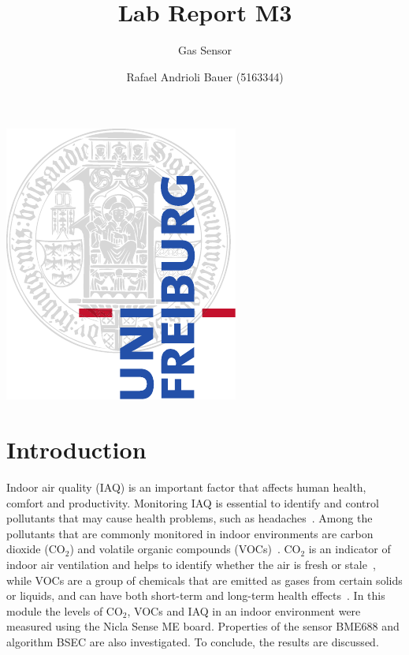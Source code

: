 \documentclass[DIV=14]{scrartcl}
\title{Lab Report M3}
\subtitle{Gas Sensor}
\author{Rafael Andrioli Bauer (5163344)}
\begin{document}
    \maketitle

    \thispagestyle{empty}

    \vfill
    \begin{center}
        \includegraphics{ufcd-logo-e1-a4-color.pdf} \vspace{1cm} \\
    \end{center}
    \vfill

    \clearpage


    \section{Introduction}

    Indoor air quality (IAQ) is an important factor that affects human health, comfort and productivity.
    Monitoring IAQ is essential to identify and control pollutants that may cause health problems, such as headaches~\cite{labManual}.
    Among the pollutants that are commonly monitored in indoor environments are carbon dioxide ($\mathrm{CO_2}$) and volatile
    organic compounds (VOCs)~\cite{labManual}.
    $\mathrm{CO_2}$ is an indicator of indoor air ventilation and helps to identify whether the air is fresh or stale~\cite{labManual},
    while VOCs are a group of chemicals that are emitted as gases from certain solids or liquids, and can have
    both short-term and long-term health effects~\cite{EPA}.
    In this module the levels of $\mathrm{CO_2}$, VOCs and IAQ in an indoor environment were measured
    using the Nicla Sense ME board.
    Properties of the sensor BME688 and algorithm BSEC are also investigated.
    To conclude, the results are discussed.
\end{document}
